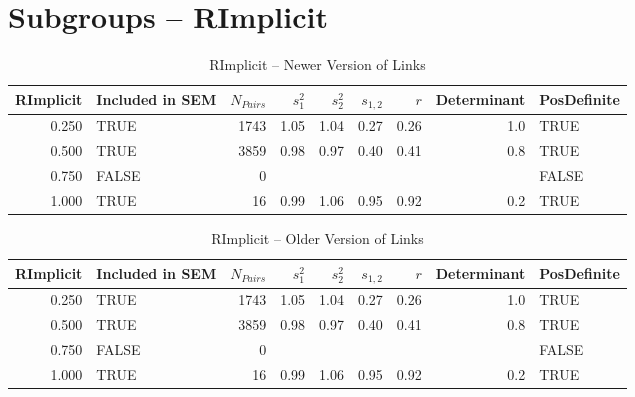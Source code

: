 \documentclass{article}\usepackage{graphicx, color}
\begin{document}
\section{Subgroups --  RImplicit }%
\begin{table}[ht]
\begin{center}
\begin{tabular}{rlrrrrrrl}
  \hline
RImplicit & Included in SEM & $N_{Pairs}$ & $s_1^2$ & $s_2^2$ & $s_{1,2}$ & $r$ & Determinant & PosDefinite \\ 
  \hline
0.250 & TRUE & 1743 & 1.05 & 1.04 & 0.27 & 0.26 & 1.0 & TRUE \\ 
  0.500 & TRUE & 3859 & 0.98 & 0.97 & 0.40 & 0.41 & 0.8 & TRUE \\ 
  0.750 & FALSE & 0 &  &  &  &  &  & FALSE \\ 
  1.000 & TRUE & 16 & 0.99 & 1.06 & 0.95 & 0.92 & 0.2 & TRUE \\ 
   \hline
\end{tabular}
\caption{RImplicit -- Newer Version of Links}
\end{center}
\end{table}
\begin{table}[ht]
\begin{center}
\begin{tabular}{rlrrrrrrl}
  \hline
RImplicit & Included in SEM & $N_{Pairs}$ & $s_1^2$ & $s_2^2$ & $s_{1,2}$ & $r$ & Determinant & PosDefinite \\ 
  \hline
0.250 & TRUE & 1743 & 1.05 & 1.04 & 0.27 & 0.26 & 1.0 & TRUE \\ 
  0.500 & TRUE & 3859 & 0.98 & 0.97 & 0.40 & 0.41 & 0.8 & TRUE \\ 
  0.750 & FALSE & 0 &  &  &  &  &  & FALSE \\ 
  1.000 & TRUE & 16 & 0.99 & 1.06 & 0.95 & 0.92 & 0.2 & TRUE \\ 
   \hline
\end{tabular}
\caption{RImplicit -- Older Version of Links}
\end{center}
\end{table}
\newpage 
\end{document}

